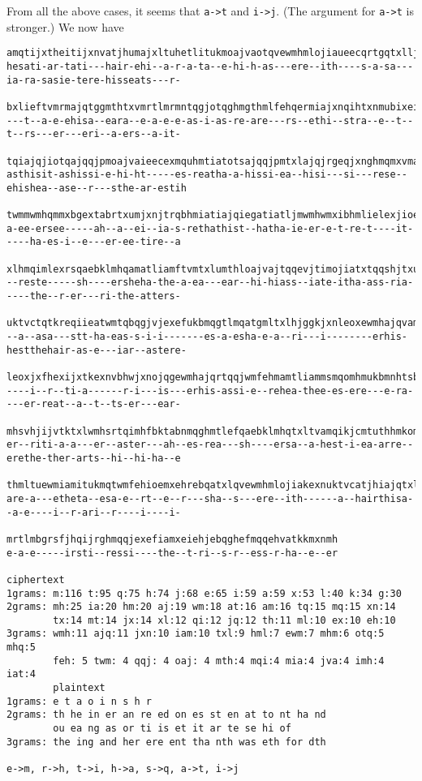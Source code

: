 From all the above cases, it seems that \verb!a->t!
and \verb!i->j!.
(The argument for \verb!a->t! is stronger.)
We now have
\begin{Verbatim}[frame=single,fontsize=\tiny]
amqtijxtheitijxnvatjhumajxltuhetlitukmoajvaotqvewmhmlojiaueecqrtgqtxlljtnhtrqtqjmximhmlajqqmtiqgbxhe
hesati-ar-tati---hair-ehi--a-r-a-ta--e-hi-h-as---ere--ith----s-a-sa---ia-ra-sasie-tere-hisseats---r-

bxlieftvmrmajqtggmthtxvmrtlmrmntqgjotqghmgthmlfehqermiajxnqihtxnmubixeifehqeewmhgeomhjxntgmhqextkjis
---t--a-e-ehisa--eara--e-a-e-e-as-i-as-re-are---rs--ethi--stra--e--t--t--rs---er---eri--a-ers--a-it-

tqiajqjiotqajqqjpmoajvaieecexmquhmtiatotsajqqjpmtxlajqjrgeqjxnghmqmxvmajqamtlotqmxehrebqiamkthnmqija
asthisit-ashissi-e-hi-ht-----es-reatha-a-hissi-ea--hisi---si---rese--ehishea--ase--r---sthe-ar-estih

twmmwmhqmmxbgextabrtxumjxnjtrqbhmiatiajqiegatiatljmwmhwmxibhmlielexjioebklatwmqkjggmlewmhrmmxijhmkst
a-ee-ersee-----ah--a--ei--ia-s-rethathist--hatha-ie-er-e-t-re-t----it-----ha-es-i--e---er-ee-tire--a

xlhmqimlexrsqaebklmhqamatliamftvmtxlumthloajvajtqqevjtimojiatxtqqshjtxubkkiamfehrmhfkehjliamktiimhqe
--reste-----sh----ersheha-the-a-ea---ear--hi-hiass--iate-itha-ass-ria-----the--r-er---ri-the-atters-

uktvctqtkreqiieatwmtqbqgjvjexefukbmqgtlmqatgmltxlhjggkjxnleoxewmhajqvamqiiamatjhotqgmvbkjthgktqimhml
--a--asa---stt-ha-eas-s-i-i-------es-a-esha-e-a--ri---i--------erhis-hestthehair-as-e---iar--astere-

leoxjxfhexijxtkexnvbhwjxnojqgewmhajqrtqqjwmfehmamtliammsmqomhmukbmnhtsbxlmhnhmtiuktvcibfiqwmhsvkmthw
----i--r--ti-a------r-i---is---erhis-assi-e--rehea-thee-es-ere---e-ra----er-reat--a--t--ts-er---ear-

mhsvhjijvtktxlwmhsrtqimhfbktabnmqghmtlefqaebklmhqtxltvamqikjcmtuthhmkomhmiameiamhgthiqefajroajvatggm
er--riti-a-a---er--aster---ah--es-rea---sh----ersa--a-hest-i-ea-arre--erethe-ther-arts--hi--hi-ha--e

thmltuewmiamitukmqtwmfehioemxehrebqatxlqvewmhmlojiakexnuktvcatjhiajqtxltumkkeojxnhethjxnhbrukjxnwejv
are-a---etheta--esa-e--rt--e--r---sha--s---ere--ith------a--hairthisa--a-e----i--r-ari--r----i----i-

mrtlmbgrsfjhqijrghmqqjexefiamxeiehjebqghefmqqehvatkkmxnmh
e-a-e-----irsti--ressi----the--t-ri--s-r--ess-r-ha--e--er

ciphertext
1grams: m:116 t:95 q:75 h:74 j:68 e:65 i:59 a:59 x:53 l:40 k:34 g:30
2grams: mh:25 ia:20 hm:20 aj:19 wm:18 at:16 am:16 tq:15 mq:15 xn:14
        tx:14 mt:14 jx:14 xl:12 qi:12 jq:12 th:11 ml:10 ex:10 eh:10
3grams: wmh:11 ajq:11 jxn:10 iam:10 txl:9 hml:7 ewm:7 mhm:6 otq:5 mhq:5
        feh: 5 twm: 4 qqj: 4 oaj: 4 mth:4 mqi:4 mia:4 jva:4 imh:4 iat:4
        plaintext
1grams: e t a o i n s h r
2grams: th he in er an re ed on es st en at to nt ha nd
        ou ea ng as or ti is et it ar te se hi of
3grams: the ing and her ere ent tha nth was eth for dth

e->m, r->h, t->i, h->a, s->q, a->t, i->j
\end{Verbatim}


